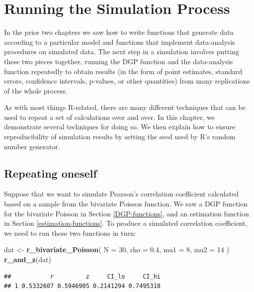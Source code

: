 \documentclass[
]{book}
\newenvironment{Shaded}{\begin{snugshade}}{\end{snugshade}}
\newcommand{\AttributeTok}[1]{\textcolor[rgb]{0.13,0.29,0.53}{#1}}
\newcommand{\DecValTok}[1]{\textcolor[rgb]{0.00,0.00,0.81}{#1}}
\newcommand{\FloatTok}[1]{\textcolor[rgb]{0.00,0.00,0.81}{#1}}
\newcommand{\FunctionTok}[1]{\textcolor[rgb]{0.13,0.29,0.53}{\textbf{#1}}}
\newcommand{\NormalTok}[1]{#1}
\newcommand{\OtherTok}[1]{\textcolor[rgb]{0.56,0.35,0.01}{#1}}
\begin{document}
\chapter{Running the Simulation Process}\label{running-the-simulation-process}

In the prior two chapters we saw how to write functions that generate data according to a particular model and functions that implement data-analysis procedures on simulated data.
The next step in a simulation involves putting these two pieces together, running the DGP function and the data-analysis function repeatedly to obtain results (in the form of point estimates, standard errors, confidence intervals, p-values, or other quantities) from many replications of the whole process.

As with most things R-related, there are many different techniques that can be used to repeat a set of calculations over and over.
In this chapter, we demonstrate several techniques for doing so.
We then explain how to ensure reproducibility of simulation results by setting the seed used by R's random number generator.

\section{Repeating oneself}\label{repeating-oneself}

Suppose that we want to simulate Pearson's correlation coefficient calculated based on a sample from the bivariate Poisson function.
We saw a DGP function for the bivariate Poisson in Section \ref{DGP-functions}, and an estimation function in Section \ref{estimation-functions}.
To produce a simulated correlation coefficient, we need to run these two functions in turn:

\begin{Shaded}
\begin{Highlighting}[]
\NormalTok{dat }\OtherTok{\textless{}{-}} \FunctionTok{r\_bivariate\_Poisson}\NormalTok{( }\AttributeTok{N =} \DecValTok{30}\NormalTok{, }\AttributeTok{rho =} \FloatTok{0.4}\NormalTok{, }\AttributeTok{mu1 =} \DecValTok{8}\NormalTok{, }\AttributeTok{mu2 =} \DecValTok{14}\NormalTok{ )}
\FunctionTok{r\_and\_z}\NormalTok{(dat)}
\end{Highlighting}
\end{Shaded}

\begin{verbatim}
##           r         z     CI_lo     CI_hi
## 1 0.5332607 0.5946905 0.2141294 0.7495318
\end{verbatim}
\end{document}
